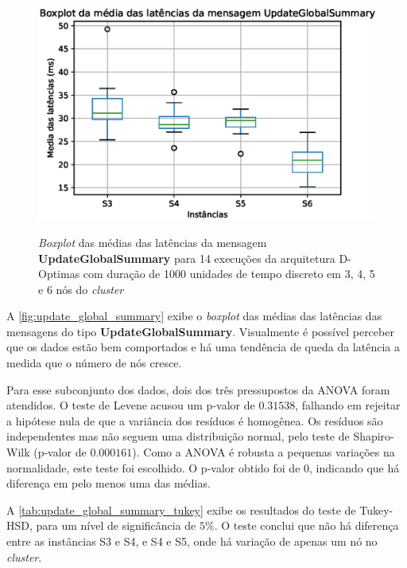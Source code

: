 \begin{figure}
    \centering
    \caption{\textit{Boxplot} das médias das latências da mensagem \textbf{UpdateGlobalSummary} para 14 execuções da arquitetura D-Optimas com duração de 1000 unidades de tempo discreto em 3, 4, 5 e 6 nós do \textit{cluster} }
    \includegraphics[scale=0.8]{imagens/update_global_summary.eps}
    \label{fig:update_global_summary}
\end{figure}

A \autoref{fig:update_global_summary} exibe o \textit{boxplot} das médias das latências das mensagens do tipo \textbf{UpdateGlobalSummary}. Visualmente é possível perceber que os dados estão bem comportados e há uma tendência de queda da latência a medida que o número de nós cresce. 

Para esse subconjunto dos dados, dois dos três pressupostos da ANOVA foram atendidos. O teste de Levene acusou um p-valor de $0.31538$, falhando em rejeitar a hipótese nula de que a variância dos resíduos é homogênea. Os resíduos são independentes mas não seguem uma distribuição normal, pelo teste de Shapiro-Wilk (p-valor de $0.000161$). Como a ANOVA é robusta a pequenas variações na normalidade, este teste foi escolhido. O p-valor obtido foi de $0$, indicando que há diferença em pelo menos uma das médias. 

A \autoref{tab:update_global_summary_tukey} exibe os resultados do teste de Tukey-HSD, para um nível de significância de $5\%$. O teste conclui que não há diferença entre as instâncias S3 e S4, e S4 e S5, onde há variação de apenas um nó no \textit{cluster}.


